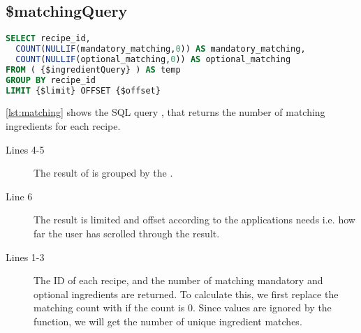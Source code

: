 \subsection*{\$matchingQuery}

\begin{lstlisting}[language=SQL, morekeywords={OFFSET}, float=h, label={lst:matching}, caption={\$matchingQuery, returns the matching ingredients count for each recipe.}]
SELECT recipe_id,
  COUNT(NULLIF(mandatory_matching,0)) AS mandatory_matching,
  COUNT(NULLIF(optional_matching,0)) AS optional_matching
FROM ( {$ingredientQuery} ) AS temp
GROUP BY recipe_id
LIMIT {$limit} OFFSET {$offset}
\end{lstlisting}
\autoref{lst:matching} shows the SQL query , that returns the number of matching ingredients for each recipe.
\begin{description}
\item[Lines 4-5] The result of  is grouped by the .
\item[Line 6] The result is limited and offset according to the applications needs i.e. how far the user has scrolled through the result.
\item[Lines 1-3] The ID of each recipe, and the number of matching mandatory and optional ingredients are returned. To calculate this, we first replace the matching count with  if the count is 0. Since  values are ignored by the  function, we will get the number of unique ingredient matches.
\end{description}




